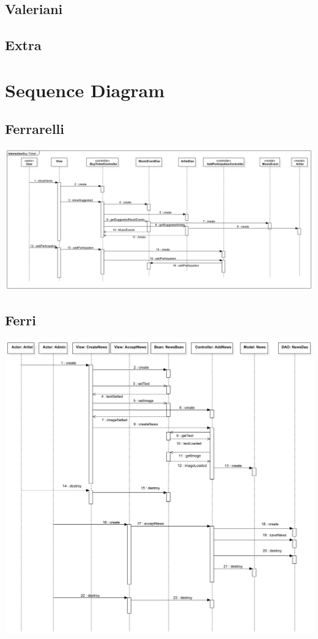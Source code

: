 \documentclass[11pt,a4paper]{article}
\begin{document}
\subsection{Valeriani}
\subsection{Extra}
\section{Sequence Diagram}
\subsection{Ferrarelli}
\includegraphics[scale=0.4]{SQFerrarelli.jpg}
\subsection{Ferri}
\includegraphics[scale=0.15]{SQFerri.jpg}
\end{document}
